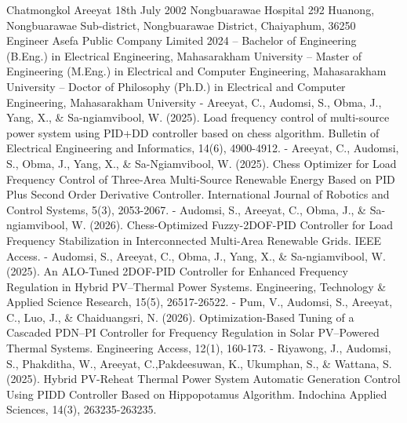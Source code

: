 \biographyAuthor
{Chatmongkol Areeyat}                      %
{18th July 2002}                           %
{Nongbuarawae Hospital}                    %
{                                          %
  292 Huanong, Nongbuarawae Sub-district,   
  Nongbuarawae District, Chaiyaphum, 36250
}
{Engineer}                                 %
{Asefa Public Company Limited}             %
{                                          %
  2024 – Bachelor of Engineering (B.Eng.) in Electrical Engineering, Mahasarakham University  – Master of Engineering (M.Eng.) in Electrical and Computer Engineering, Mahasarakham University  – Doctor of Philosophy (Ph.D.) in Electrical and Computer Engineering, Mahasarakham University 
}
{                                          %
  - Areeyat, C., Audomsi, S., Obma, J., Yang, X., \& Sa-ngiamvibool, W. (2025). Load frequency control of multi-source power system using PID+DD controller based on chess algorithm. Bulletin of Electrical Engineering and Informatics, 14(6), 4900-4912. \newline
  - Areeyat, C., Audomsi, S., Obma, J., Yang, X., \& Sa-Ngiamvibool, W. (2025). Chess Optimizer for Load Frequency Control of Three-Area Multi-Source Renewable Energy Based on PID Plus Second Order Derivative Controller. International Journal of Robotics and Control Systems, 5(3), 2053-2067. \newline
  - Audomsi, S., Areeyat, C., Obma, J., \& Sa-ngiamvibool, W. (2026). Chess-Optimized Fuzzy-2DOF-PID Controller for Load Frequency Stabilization in Interconnected Multi-Area Renewable Grids. IEEE Access. \newline
  - Audomsi, S., Areeyat, C., Obma, J., Yang, X., \& Sa-ngiamvibool, W. (2025). An ALO-Tuned 2DOF-PID Controller for Enhanced Frequency Regulation in Hybrid PV–Thermal Power Systems. Engineering, Technology \& Applied Science Research, 15(5), 26517-26522. \newline
  - Pum, V., Audomsi, S., Areeyat, C., Luo, J., \& Chaiduangsri, N. (2026). Optimization-Based Tuning of a Cascaded PDN–PI Controller for Frequency Regulation in Solar PV–Powered Thermal Systems. Engineering Access, 12(1), 160-173. \newline
  - Riyawong, J., Audomsi, S., Phakditha, W., Areeyat, C.,\newline Pakdeesuwan, K., Ukumphan, S., \& Wattana, S. (2025). Hybrid PV-Reheat Thermal Power System Automatic Generation Control Using PIDD Controller Based on Hippopotamus Algorithm. Indochina Applied Sciences, 14(3), 263235-263235.
}
{}                                         %